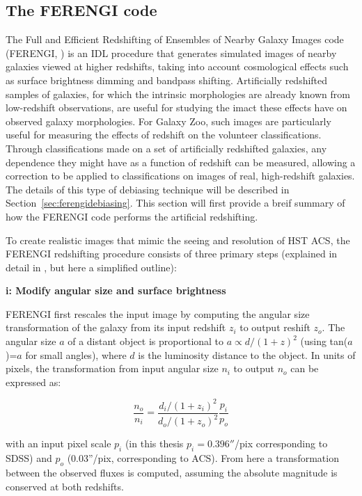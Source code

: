 \subsection{The FERENGI code}
\label{sec:ferengicode}
The Full and Efficient Redshifting of Ensembles of Nearby Galaxy Images code (FERENGI, \citet{Barden2008}) is an IDL procedure that generates simulated images of nearby galaxies viewed at higher redshifts, taking into account cosmological effects such as surface brightness dimming and bandpass shifting. Artificially redshifted samples of galaxies, for which the intrinsic morphologies are already known from low-redshift observations, are useful for studying the imact these effects have on observed galaxy morphologies. For Galaxy Zoo, such images are particularly useful for measuring the effects of redshift on the volunteer classifications. Through classifications made on a set of artificially redshifted galaxies, any dependence they might have as a function of redshift can be measured, allowing a correction to be applied to classifications on images of real, high-redshift galaxies. The details of this type of debiasing technique will be described in Section~\ref{sec:ferengidebiasing}. This section will first provide a breif summary of how the FERENGI code performs the artificial redshifting.

To create realistic images that mimic the seeing and resolution of HST ACS, the FERENGI redshifting procedure consists of three primary steps (explained in detail in \citet{Barden2008}, but here a simplified outline):

\textbf{i: Modify angular size and surface brightness}

FERENGI first rescales the input image by computing the angular size transformation of the galaxy from its input redshift $z_{i}$ to output reshift $z_{o}$. The angular size $a$ of a distant object is proportional to $a \propto d/(1+z)^2$ (using tan($a$)=$a$ for small angles), where $d$ is the luminosity distance to the object. In units of pixels, the transformation from input angular size $n_{i}$ to output $n_{o}$ can be expressed as:

\begin{equation}
\frac{n_{o}}{n_{i}}= \frac{d_{i}/(1+z_{i})^2}{d_{o}/(1+z_{o})^2} \frac{p_{i}}{p_{o}} 
\label{eqn:ferengi_rebinning}
\end{equation}

with an input pixel scale $p_{i}$ (in this thesis $p_{i}=0.396''$/pix corresponding to SDSS) and $p_{o}$ (0.03''/pix, corresponding to ACS). From here a transformation between the observed fluxes is computed, assuming the absolute magnitude is conserved at both redshifts. 

